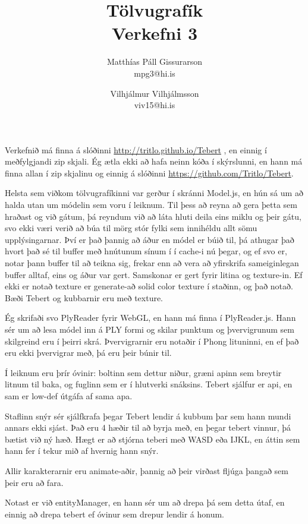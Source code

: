 \documentclass[12pt]{article}
\title{Tölvugrafík\\Verkefni 3}
\author{Matthías Páll Gissurarson \\mpg3@hi.is \and Vilhjálmur Vilhjálmsson \\viv15@hi.is}
\begin{document}
\maketitle

Verkefnið má finna á slóðinni \url{http://tritlo.github.io/Tebert}
, en einnig í meðfylgjandi zip skjali. Ég ætla ekki að hafa neinn kóða í skýrslunni,
en hann má finna allan í zip skjalinu og einnig á slóðinni \url{https://github.com/Tritlo/Tebert}.

Helsta sem viðkom tölvugrafíkinni var gerður í skránni Model.js,
en hún sá um að halda utan um módelin sem voru í leiknum. Til þess að reyna 
að gera þetta sem hraðast og við gátum, þá reyndum við að láta hluti deila
eins miklu og þeir gátu, svo ekki væri verið að búa til mörg stór fylki
sem innihéldu allt sömu upplýsingarnar. Því er það þannig að áður en módel
er búið til, þá athugar það hvort það sé til buffer með hnútunum sínum í 
í cache-i nú þegar, og ef svo er, notar þann buffer til að teikna sig, frekar
enn að vera að yfirskrifa sameiginlegan buffer alltaf, eins og áður var gert.
Samskonar er gert fyrir litina og texture-in. Ef ekki er notað texture
er generate-að solid color texture í staðinn, og það notað. Bæði Tebert og 
kubbarnir eru með texture.

Ég skrifaði svo PlyReader fyrir WebGL, en hann má finna í PlyReader.js.
Hann sér um að lesa módel inn á PLY formi og skilar punktum og þvervigrunum
sem skilgreind eru í þeirri skrá. Þvervigrarnir eru notaðir í Phong lituninni,
en ef það eru ekki þvervigrar með, þá eru þeir búnir til.

Í leiknum eru þrír óvinir: boltinn sem dettur niður, græni apinn sem breytir
litnum til baka, og fuglinn sem er í hlutverki snáksins. Tebert sjálfur
er api, en sam er low-def útgáfa af sama apa. 

Staflinn snýr sér sjálfkrafa þegar Tebert lendir á kubbum þar sem hann mundi 
annars ekki sjást. Það eru 4 hæðir til að byrja með, en þegar tebert vinnur,
þá bætist við ný hæð. Hægt er að stjórna teberi með WASD eða IJKL, en
áttin sem hann fer í tekur mið af hvernig hann snýr.

Allir karakterarnir eru animate-aðir, þannig að þeir virðast fljúga þangað
sem þeir eru að fara.

Notast er við entityManager, en hann sér um að drepa þá sem detta útaf,
en einnig að drepa tebert ef óvinur sem drepur lendir á honum.
\end{document}
